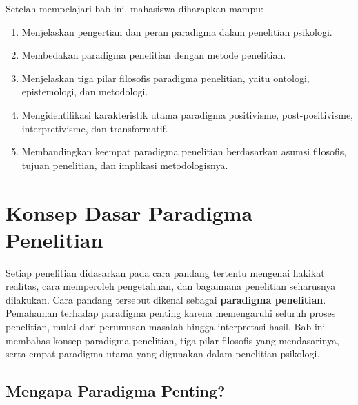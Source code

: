 \documentclass[
  indonesian,
  letterpaper,
  DIV=11,
  numbers=noendperiod]{scrreprt}
\providecommand{\tightlist}{%
  \setlength{\itemsep}{0pt}\setlength{\parskip}{0pt}}
\begin{document}
\begin{tcolorbox}[enhanced jigsaw, colframe=quarto-callout-note-color-frame, toptitle=1mm, breakable, leftrule=.75mm, arc=.35mm, toprule=.15mm, colback=white, colbacktitle=quarto-callout-note-color!10!white, bottomtitle=1mm, bottomrule=.15mm, titlerule=0mm, title=\textcolor{quarto-callout-note-color}{\faInfo}\hspace{0.5em}{Tujuan Pembelajaran}, coltitle=black, left=2mm, opacitybacktitle=0.6, opacityback=0, rightrule=.15mm]

Setelah mempelajari bab ini, mahasiswa diharapkan mampu:

\begin{enumerate}
\def\labelenumi{\arabic{enumi}.}
\tightlist
\item
  Menjelaskan pengertian dan peran paradigma dalam penelitian psikologi.
\item
  Membedakan paradigma penelitian dengan metode penelitian.
\item
  Menjelaskan tiga pilar filosofis paradigma penelitian, yaitu ontologi,
  epistemologi, dan metodologi.
\item
  Mengidentifikasi karakteristik utama paradigma positivisme,
  post-positivisme, interpretivisme, dan transformatif.
\item
  Membandingkan keempat paradigma penelitian berdasarkan asumsi
  filosofis, tujuan penelitian, dan implikasi metodologisnya.
\end{enumerate}

\end{tcolorbox}

\section{Konsep Dasar Paradigma
Penelitian}\label{konsep-dasar-paradigma-penelitian}

Setiap penelitian didasarkan pada cara pandang tertentu mengenai hakikat
realitas, cara memperoleh pengetahuan, dan bagaimana penelitian
seharusnya dilakukan. Cara pandang tersebut dikenal sebagai
\textbf{paradigma penelitian}. Pemahaman terhadap paradigma penting
karena memengaruhi seluruh proses penelitian, mulai dari perumusan
masalah hingga interpretasi hasil. Bab ini membahas konsep paradigma
penelitian, tiga pilar filosofis yang mendasarinya, serta empat
paradigma utama yang digunakan dalam penelitian psikologi.

\subsection{Mengapa Paradigma Penting?}\label{mengapa-paradigma-penting}
\end{document}
